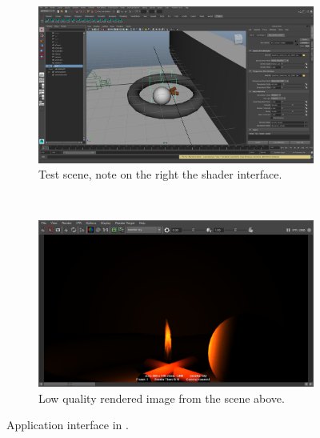 \begin{figure}[htpb!]
        \centering
        \begin{subfigure}[t]{\textwidth}
                \includegraphics[width=\textwidth]{img/application_example}
                \caption{Test scene, note on the right the shader interface.}
                \label{fig:application_example}
        \end{subfigure}%
        \\  %
        \begin{subfigure}[t]{\textwidth}
                \includegraphics[width=\textwidth]{img/application_example_render}
                \caption{Low quality rendered image from the scene above.}
                \label{fig:application_example_render}
        \end{subfigure}
        \caption{Application interface in \Mayash.}
        \label{fig:application_example_full}
\end{figure}

